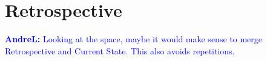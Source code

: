\documentclass[]{article}
\newcommand{\B}[1]{\textbf{#1}}
\newcommand{\alnote}[1]{{\textcolor{blue}{    \B{AndreL:  } #1 }}}
\newcommand{\alnote}[1]{}
\begin{document}
 




\section{Retrospective}
\label{sec:retro}
\alnote{Looking at the space, maybe it would make sense to merge Retrospective and Current State. This also avoids repetitions.}
\end{document}
